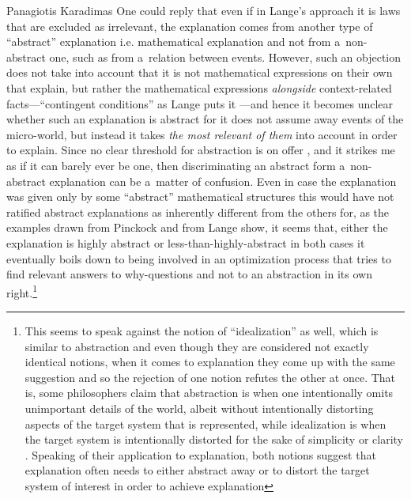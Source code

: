 \begin{artengenv}{Panagiotis Karadimas}
One could reply that even if in Lange's approach it is laws that are excluded as irrelevant, the explanation comes from another type of ``abstract'' explanation i.e. mathematical explanation and not from a~non-abstract one, such as from a~relation between events. However, such an objection does not take into account that it is not mathematical expressions on their own that explain, but rather the mathematical expressions \textit{alongside} context-related facts---``contingent conditions'' as Lange puts it
\parencite[][p.506]{lange_what_2013}%
---and hence it becomes unclear whether such an explanation is abstract for it does not assume away events of the micro-world, but instead it takes \textit{the most relevant of them} into account in order to explain. Since no clear threshold for abstraction is on offer 
\parencite[][]{jansson_explanatory_2019}, %
 and it strikes me as if it can barely ever be one, then discriminating an abstract form a~non-abstract explanation can be a~matter of confusion. Even in case the explanation was given only by some ``abstract'' mathematical structures this would have not ratified abstract explanations as inherently different from the others for, as the examples drawn from Pinckock and from Lange show, it seems that, either the explanation is highly abstract or less-than-highly-abstract in both cases it eventually boils down to being involved in an optimization process that tries to find relevant answers to why-questions and not to an abstraction in its own right.\footnote{This seems to speak against the notion of ``idealization'' as well, which is similar to abstraction and even though they are considered not exactly identical notions, when it comes to explanation they come up with the same suggestion and so the rejection of one notion refutes the other at once. That is, some philosophers claim that abstraction is when one intentionally omits unimportant details of the world, albeit without intentionally distorting aspects of the target system that is represented, while idealization is when the target system is intentionally distorted for the sake of simplicity or clarity 
\parencites[][]{godfrey-smith_abstractions_2009}[][]{levy_idealization_2021}. %
 Speaking of their application to explanation, both notions suggest that explanation often needs to either abstract away or to distort the target system of interest in order to achieve explanation 
}
\end{artengenv}
